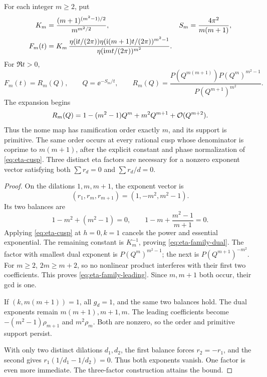 \begin{theorem}
\label{thm:three-factors}
For each integer \(m\ge2\), put
\begin{align}
 K_m&=\frac{(m+1)^{(m^2-1)/2}}{m^{m^2/2}},
 &S_m&=\frac{4\pi^2}{m(m+1)},\notag\\
 F_m(t)&=
 K_m\,\frac{\eta(\mathrm i t/(2\pi))
              \eta(\mathrm i(m+1)t/(2\pi))^{m^2-1}}
             {\eta(\mathrm i m t/(2\pi))^{m^2}}.
 \label{eq:eta-family}
\end{align}
For \(\Re t>0\),
\begin{equation}\label{eq:eta-family-dual}
 F_m(t)=R_m(Q),\qquad Q=\ee^{-S_m/t},\qquad
 R_m(Q)=
 \frac{P(Q^{m(m+1)})P(Q^m)^{m^2-1}}
      {P(Q^{m+1})^{m^2}}.
\end{equation}
The expansion begins
\begin{equation}\label{eq:eta-family-leading}
 R_m(Q)=1-(m^2-1)Q^m+m^2Q^{m+1}
                 +\mathcal O(Q^{m+2}).
\end{equation}
Thus the nome map has ramification order exactly \(m\), and its
support is primitive.  The same order occurs at every rational cusp
whose denominator is coprime to \(m(m+1)\), after the explicit
constant and phase normalization of \cref{eq:eta-cusp}.
Three distinct eta factors are necessary for a nonzero exponent
vector satisfying both
\(\sum r_d=0\) and \(\sum r_d/d=0\).
\end{theorem}
\begin{proof}
On the dilations \(1,m,m+1\), the exponent vector is
\[
 (r_1,r_m,r_{m+1})=(1,-m^2,m^2-1).
\]
Its two balances are
\[
 1-m^2+(m^2-1)=0,\qquad
 1-m+\frac{m^2-1}{m+1}=0.
\]
Applying \cref{eq:eta-cusp} at \(h=0,k=1\) cancels the
power and essential exponential.  The remaining constant is
\(K_m^{-1}\), proving \cref{eq:eta-family-dual}.
The factor with smallest dual exponent is \(P(Q^m)^{m^2-1}\);
the next is \(P(Q^{m+1})^{-m^2}\).
For \(m\ge2\), \(2m\ge m+2\), so no nonlinear product interferes
with their first two coefficients.  This proves
\cref{eq:eta-family-leading}.  Since \(m,m+1\) both occur,
their gcd is one.

If \((k,m(m+1))=1\), all \(g_d=1\), and the same two balances
hold.  The dual exponents remain \(m(m+1),m+1,m\).
The leading coefficients become
\(-(m^2-1)\rho_{m+1}\) and \(m^2\rho_m\).
Both are nonzero, so the order and primitive support persist.

With only two distinct dilations \(d_1,d_2\), the first balance
forces \(r_2=-r_1\), and the second gives
\(r_1(1/d_1-1/d_2)=0\).
Thus both exponents vanish.  One factor is even more immediate.
The three-factor construction attains the bound.
\end{proof}

